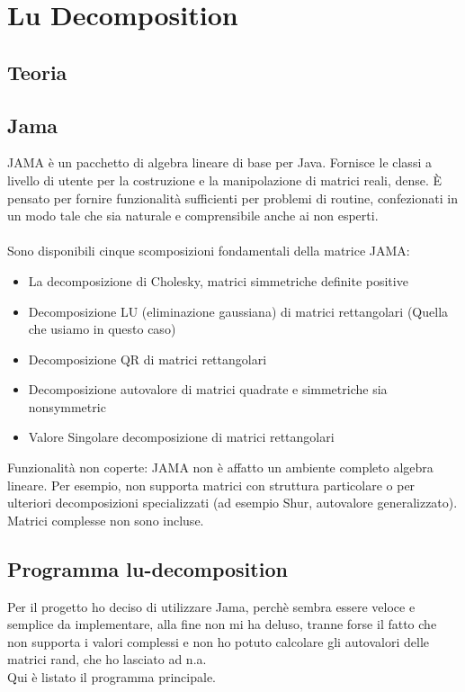 \documentclass[12pt]{article}
\begin{document}
\maketitle

\section{Lu Decomposition}

\subsection{Teoria}

\subsection{Jama}
JAMA \`e un pacchetto di algebra lineare di base per Java. Fornisce le classi a livello di utente per la costruzione e la manipolazione di matrici reali, dense. \`E pensato per fornire funzionalit\`a sufficienti per problemi di routine, confezionati in un modo tale che sia naturale e comprensibile anche ai non esperti. \\
\\
Sono disponibili cinque scomposizioni fondamentali della matrice JAMA:
\begin{itemize}
\item La decomposizione di Cholesky, matrici simmetriche definite positive
\item Decomposizione LU (eliminazione gaussiana) di matrici rettangolari (Quella che usiamo in questo caso)
\item Decomposizione QR di matrici rettangolari
\item Decomposizione autovalore di matrici quadrate e simmetriche sia nonsymmetric
\item Valore Singolare decomposizione di matrici rettangolari
\end{itemize}
Funzionalit\`a non coperte: JAMA non \`e affatto un ambiente completo algebra lineare. Per esempio, non supporta matrici con struttura particolare o per ulteriori decomposizioni specializzati (ad esempio Shur, autovalore generalizzato). Matrici complesse non sono incluse. \\

\subsection{Programma lu-decomposition}
Per il progetto ho deciso di utilizzare Jama, perch\`e sembra essere veloce e semplice da implementare, alla fine non mi ha deluso, tranne forse il fatto che non supporta i valori complessi e non ho potuto calcolare gli autovalori delle matrici rand, che ho lasciato ad n.a.\\
Qui \`e listato il programma principale.
\end{document}
